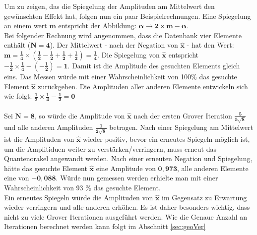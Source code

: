 \noindent
Um zu zeigen, das die Spiegelung der Amplituden am Mittelwert den gewünschten Effekt hat, folgen nun ein paar Beispielrechnungen. Eine Spiegelung an einem wert $\mathbf{m}$ entspricht der Abbildung: $\mathbf{\alpha \rightarrow 2 \times m - \alpha}$. \\
Bei folgender Rechnung wird angenommen, dass die Datenbank vier Elemente enthält ($\mathbf{N=4}$). Der Mittelwert - nach der Negation von $\mathbf{\hat x}$ - hat den Wert: $\mathbf{m = \frac{1}{4} \times (\frac{1}{2}- \frac{1}{2}+ \frac{1}{2} +\frac{1}{2}) = \frac{1}{4}}$. Die Spiegelung von $\mathbf{\hat x}$ entspricht $\mathbf{-\frac{1}{2} \times \frac{1}{4} - (-\frac{1}{2}) = 1}$. Damit ist die Amplitude des gesuchten Elements gleich eins. Das Messen würde mit einer Wahrscheinlichkeit von 100\%  das gesuchte Element $\mathbf{\hat x}$ zurückgeben. Die Amplituden aller anderen Elemente entwickeln sich wie folgt: $\mathbf{\frac{1}{2} \times \frac{1}{4} - \frac{1}{2} = 0}$
\\ \\
Sei $\mathbf{N = 8}$, so würde die Amplitude von $\mathbf{ \hat x}$ nach der ersten Grover Iteration $\mathbf{\frac{5}{5\sqrt 8}}$ und alle anderen Amplituden $\mathbf{\frac{1}{2\sqrt 8}}$ betragen. Nach einer Spiegelung am Mittelwert ist die Amplituden von $\mathbf{\hat x}$ wieder positiv, bevor ein erneutes Spiegeln möglich ist, um die Amplitiduen weiter zu verstärken/verringern, muss erneut das Quantenorakel angewandt werden. Nach einer erneuten Negation und Spiegelung, hätte das gesuchte Element $\mathbf{\hat x}$ eine Amplitude von $\mathbf{0,973}$, alle anderen Elemente eine von $\mathbf{-0, 088}$. Würde nun gemessen werden erhielte man mit einer Wahrscheinlichkeit von 93 \% das gesuchte Element.
\\ 
Ein erneutes Spiegeln würde die Amplituden von $\mathbf{\hat{x}}$ im Gegensatz zu Erwartung wieder verringern und alle anderen erhöhen. Es ist daher besonders wichtig, dass nicht zu viele Grover Iterationen ausgeführt werden. Wie die Genaue Anzahl an Iterationen berechnet werden kann folgt im Abschnitt \ref{sec:geoVer}

